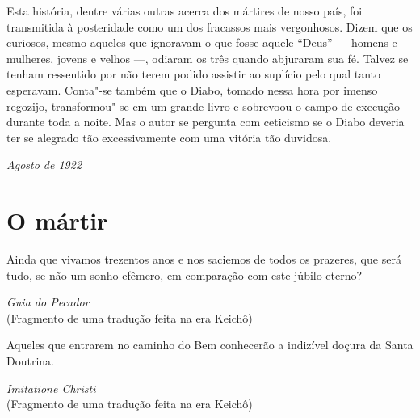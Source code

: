 Esta história, dentre várias outras acerca dos mártires de nosso país,
foi transmitida à posteridade como um dos fracassos mais vergonhosos.
Dizem que os curiosos, mesmo aqueles que ignoravam o que fosse aquele
``Deus'' --- homens e mulheres, jovens e velhos ---, odiaram os três quando 
abjuraram sua fé. Talvez se tenham ressentido por não terem podido
assistir ao suplício pelo qual tanto esperavam. Conta"-se também que o
Diabo, tomado nessa hora por imenso regozijo, transformou"-se em um
grande livro e sobrevoou o campo de execução durante toda a noite. Mas
o autor se pergunta com ceticismo se o Diabo deveria ter se alegrado
tão excessivamente com uma vitória tão duvidosa.

\begin{flushright}
\textit{Agosto de 1922}\\  
\end{flushright}

\chapter{O mártir}

\epigraph{Ainda que vivamos trezentos anos e nos saciemos de todos os prazeres,
que será tudo, se não um sonho efêmero, em comparação com este júbilo
eterno?}{\textit{Guia do Pecador}\\ (Fragmento de uma tradução feita na era
Keichô)\footnotemark}

\epigraph{Aqueles que entrarem no caminho do Bem conhecerão a indizível doçura
da Santa Doutrina.}{\textit{Imitatione Christi}\\ (Fragmento de uma tradução feita na
era Keichô)}

\sectionitem


